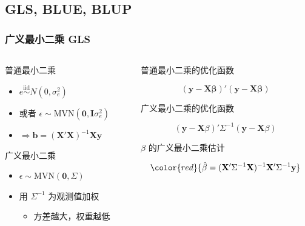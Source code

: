 \documentclass[serif,aspectratio=169]{beamer}
\begin{document}
\subsection{GLS, BLUE, BLUP}
\begin{frame}
  \frametitle{广义最小二乘 GLS}
  \begin{columns}
    \begin{column}{.5\textwidth}
      \begin{block}{普通最小二乘}
        \begin{itemize}
        \item $e\stackrel{\mathrm{iid}}{\sim}N(0,\sigma_e^2)$
        \item 或者 $\epsilon\sim\mathrm{MVN}(\mathbf{0}, \mathbf{I}\sigma_e^2)$
        \item $\Rightarrow\hat{\mathbf{b}}=(\mathbf{X'X})^{-1}\mathbf{Xy}$
        \end{itemize}
      \end{block}
      \begin{block}{广义最小二乘}
        \begin{itemize}
        \item $\epsilon\sim\mathrm{MVN}(\mathbf{0}, \Sigma)$
        \item 用 $\Sigma^{-1}$ 为观测值加权
          \begin{itemize}
          \item 方差越大，权重越低
          \end{itemize}
        \end{itemize}
      \end{block}
    \end{column}

    \pause
    
    \begin{column}{.5\textwidth}
      \begin{block}{普通最小二乘的优化函数}

        \vspace{-2ex}
        
        $$\mathbf{(y-X\beta)'(y-X\beta)}$$
      \end{block}

      \begin{block}{广义最小二乘的优化函数}

        \vspace{-2ex}
        
        $$(\mathbf{y}-\mathbf{X}\beta)'\Sigma^{-1}(\mathbf{y}-\mathbf{X}\beta)$$
      \end{block}

      \pause
      \begin{block}{$\beta$ 的广义最小二乘估计}

        \vspace{-2ex}
        
        $$\color{red}{\hat{\beta} = (\mathbf{X}'\Sigma^{-1}\mathbf{X})^{-1}\mathbf{X}'\Sigma^{-1}\mathbf{y}}$$
      \end{block}
    \end{column}
  \end{columns}
\end{frame}
\end{document}
